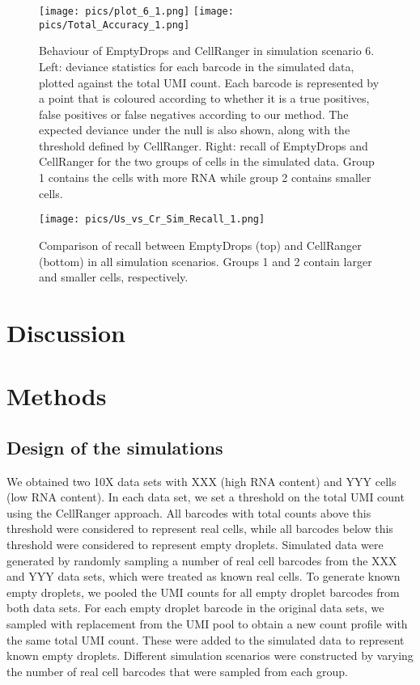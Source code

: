 \documentclass[10pt,letterpaper]{article}
\begin{document}
\begin{figure}[bt]
\begin{center}
    \texttt{[image: pics/plot\_6\_1.png]}
    \texttt{[image: pics/Total\_Accuracy\_1.png]}
\end{center}
\caption{Behaviour of EmptyDrops and CellRanger in simulation scenario 6.
    Left: deviance statistics for each barcode in the simulated data, plotted against the total UMI count.
    Each barcode is represented by a point that is coloured according to whether it is a true positives, false positives or false negatives according to our method.
    The expected deviance under the null is also shown, along with the threshold defined by CellRanger.
    Right: recall of EmptyDrops and CellRanger for the two groups of cells in the simulated data.
    Group 1 contains the cells with more RNA while group 2 contains smaller cells.
}
\label{fig:simdemo}
\end{figure}

\begin{figure}[bt]
    \begin{center}
        \texttt{[image: pics/Us\_vs\_Cr\_Sim\_Recall\_1.png]}
    \end{center}
    \caption{Comparison of recall between EmptyDrops (top) and CellRanger (bottom) in all simulation scenarios.
    Groups 1 and 2 contain larger and smaller cells, respectively.}
    \label{fig:simall}
\end{figure}

\section*{Discussion}

\section*{Methods}

\subsection*{Design of the simulations}
We obtained two 10X data sets with XXX (high RNA content) and YYY cells (low RNA content).
In each data set, we set a threshold on the total UMI count using the CellRanger approach.
All barcodes with total counts above this threshold were considered to represent real cells, while all barcodes below this threshold were considered to represent empty droplets.
Simulated data were generated by randomly sampling a number of real cell barcodes from the XXX and YYY data sets, which were treated as known real cells.
To generate known empty droplets, we pooled the UMI counts for all empty droplet barcodes from both data sets. 
For each empty droplet barcode in the original data sets, we sampled with replacement from the UMI pool to obtain a new count profile with the same total UMI count.
These were added to the simulated data to represent known empty droplets.
Different simulation scenarios were constructed by varying the number of real cell barcodes that were sampled from each group.
\end{document}
